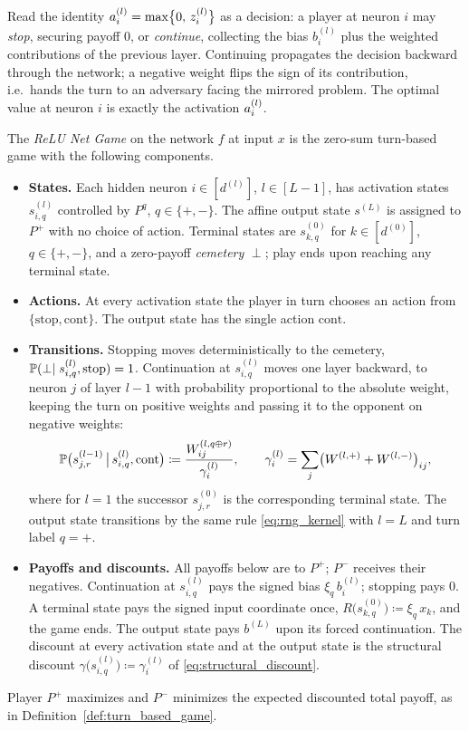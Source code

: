Read the identity $\actl{l}_i = \max\bigl\{0,\, \preactl{l}_i\bigr\}$ as a decision: a player at neuron $i$ may \emph{stop}, securing payoff $0$, or \emph{continue}, collecting the bias $b^{(l)}_i$ plus the weighted contributions of the previous layer. Continuing propagates the decision backward through the network; a negative weight flips the sign of its contribution, i.e.\ hands the turn to an adversary facing the mirrored problem. The optimal value at neuron $i$ is exactly the activation $\actl{l}_i$.

\begin{definition}\label{def:relu_net_game}
The \emph{ReLU Net Game} on the network $f$ at input $x$ is the zero-sum turn-based game with the following components.
\begin{itemize}
	\item \textbf{States.} Each hidden neuron $i\in[d^{(l)}]$, $l\in[L-1]$, has activation states $s^{(l)}_{i,q}$ controlled by $P^q$, $q\in\{+,-\}$. The affine output state $s^{(L)}$ is assigned to $P^+$ with no choice of action. Terminal states are $s^{(0)}_{k,q}$ for $k\in[d^{(0)}]$, $q\in\{+,-\}$, and a zero-payoff \emph{cemetery} $\perp$; play ends upon reaching any terminal state.
	\item \textbf{Actions.} At every activation state the player in turn chooses an action from $\{\mathrm{stop}, \mathrm{cont}\}$. The output state has the single action $\mathrm{cont}$.
	\item \textbf{Transitions.} Stopping moves deterministically to the cemetery, $\P(\perp \mid s^{(l)}_{i,q}, \mathrm{stop}) = 1$. Continuation at $s^{(l)}_{i,q}$ moves one layer backward, to neuron $j$ of layer $l-1$ with probability proportional to the absolute weight, keeping the turn on positive weights and passing it to the opponent on negative weights:
	\begin{equation}
		\P\bigl( s^{(l-1)}_{j,r} \,\big|\, s^{(l)}_{i,q}, \mathrm{cont} \bigr)
		\coloneqq \frac{\Wsig{l}{q \oplus r}_{ij}}{\gamma^{(l)}_i},
		\qquad
		\gamma^{(l)}_i = \sum_{j} \bigl( \Wsig{l}{+} + \Wsig{l}{-} \bigr)_{ij},
		\label{eq:rng_kernel}
	\end{equation}
	where for $l = 1$ the successor $s^{(0)}_{j,r}$ is the corresponding terminal state. The output state transitions by the same rule \eqref{eq:rng_kernel} with $l = L$ and turn label $q = +$.
	\item \textbf{Payoffs and discounts.} All payoffs below are to $P^+$; $P^-$ receives their negatives. Continuation at $s^{(l)}_{i,q}$ pays the signed bias $\xi_{q}\, b^{(l)}_i$; stopping pays $0$. A terminal state pays the signed input coordinate once, $R\bigl(s^{(0)}_{k,q}\bigr) \coloneqq \xi_{q}\, x_k$, and the game ends. The output state pays $b^{(L)}$ upon its forced continuation. The discount at every activation state and at the output state is the structural discount $\gamma\bigl(s^{(l)}_{i,q}\bigr) \coloneqq \gamma^{(l)}_i$ of \eqref{eq:structural_discount}.
\end{itemize}
Player $P^{+}$ maximizes and $P^{-}$ minimizes the expected discounted total payoff, as in Definition~\ref{def:turn_based_game}.
\end{definition}

